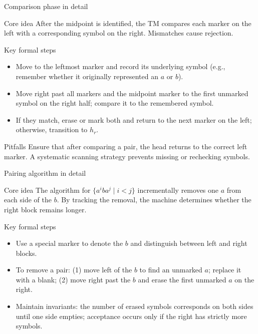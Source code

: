 \begin{frame}[t]{Comparison phase in detail}
  \begin{tblock}{Core idea}
    After the midpoint is identified, the TM compares each marker on
    the left with a corresponding symbol on the right.  Mismatches
    cause rejection.
  \end{tblock}
  \begin{tblock}{Key formal steps}
    \begin{itemize}
      \item Move to the leftmost marker and record its underlying symbol
        (e.g., remember whether it originally represented an $a$ or $b$).
      \item Move right past all markers and the midpoint marker to
        the first unmarked symbol on the right half; compare it to the
        remembered symbol.
      \item If they match, erase or mark both and return to the next
        marker on the left; otherwise, transition to $h_r$.
    \end{itemize}
  \end{tblock}
  \begin{talert}{Pitfalls}
    Ensure that after comparing a pair, the head returns to the
    correct left marker.  A systematic scanning strategy prevents
    missing or rechecking symbols.
  \end{talert}
  \label{fr:7.2-16}
\end{frame}

\begin{frame}[t]{Pairing algorithm in detail}
  \begin{tblock}{Core idea}
    The algorithm for $\{a^i b a^j \mid i<j\}$ incrementally removes
    one $a$ from each side of the $b$.  By tracking the removal, the
    machine determines whether the right block remains longer.
  \end{tblock}
  \begin{tblock}{Key formal steps}
    \begin{itemize}
      \item Use a special marker to denote the $b$ and distinguish
        between left and right blocks.
      \item To remove a pair: (1) move left of the $b$ to find an
        unmarked $a$; replace it with a blank; (2) move right past
        the $b$ and erase the first unmarked $a$ on the right.
      \item Maintain invariants: the number of erased symbols
        corresponds on both sides until one side empties; acceptance
        occurs only if the right has strictly more symbols.
    \end{itemize}
  \end{tblock}
  \label{fr:7.2-17}
\end{frame}


